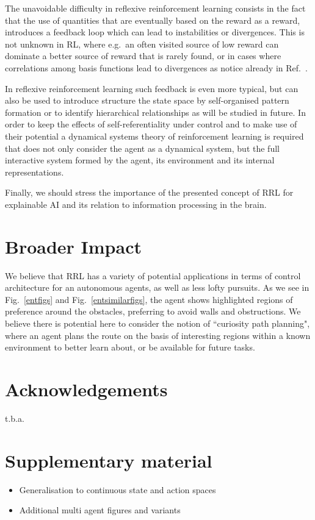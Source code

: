 \documentclass{article}
\begin{document}
The unavoidable difficulty in reflexive reinforcement learning consists in the 
fact that the use of quantities that are eventually based on the reward as a
reward, introduces a feedback loop which can lead to instabilities or divergences. This is not unknown in RL, where e.g.~an often visited source of low reward can dominate a better source of reward that is rarely found, or in cases where correlations among basis functions lead to divergences as notice already in Ref.~\citep{baird1995residual}. 

In reflexive reinforcement learning such 
feedback is even more typical, but can also be used to introduce structure the 
state space by self-organised pattern formation or to identify hierarchical 
relationships as will be studied in future. In order to keep the effects of 
self-referentiality under control and to make use of their potential
a dynamical systems theory of reinforcement learning is required that 
does not only consider the agent as a dynamical system, but the full interactive 
system formed by the agent, its environment and its internal representations.

Finally, we should stress the importance of the presented concept of RRL for explainable AI and its relation to information processing in the brain.

\section*{Broader Impact}

We believe that RRL has a variety of potential applications in terms of control architecture for an autonomous agents, as well as less lofty pursuits. As we see in Fig.~\ref{entfigs} and Fig.~\ref{entsimilarfigs}, the agent shows highlighted regions of preference around the obstacles, preferring to avoid walls and obstructions. We believe there is potential here to consider the notion of ``curiosity path planning", where an agent plans the route on the basis of interesting regions within a known environment to better learn about, or be available for future tasks.


\section*{Acknowledgements}

\noindent t.b.a.




\section*{Supplementary material}
\begin{itemize}
	\item Generalisation to continuous state and action spaces
	\item Additional multi agent figures and variants
\end{itemize}
\end{document}
